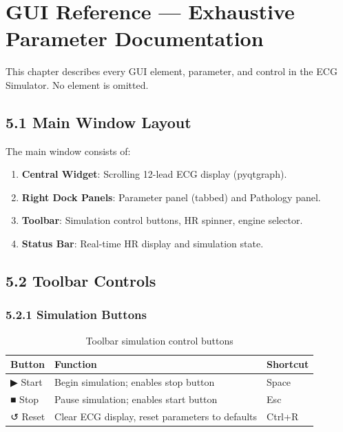 \chapter{GUI Reference — Exhaustive Parameter Documentation}

This chapter describes every GUI element, parameter, and control in the ECG Simulator. No element is omitted.

\section{5.1 Main Window Layout}

The main window consists of:

\begin{enumerate}
  \item \textbf{Central Widget}: Scrolling 12-lead ECG display (pyqtgraph).
  \item \textbf{Right Dock Panels}: Parameter panel (tabbed) and Pathology panel.
  \item \textbf{Toolbar}: Simulation control buttons, HR spinner, engine selector.
  \item \textbf{Status Bar}: Real-time HR display and simulation state.
\end{enumerate}

\section{5.2 Toolbar Controls}

\subsection{5.2.1 Simulation Buttons}

\begin{table}[H]
\centering
\begin{tabularx}{\textwidth}{|l|X|l|}
\hline
\textbf{Button} & \textbf{Function} & \textbf{Shortcut} \\
\hline
▶ Start & Begin simulation; enables stop button & Space \\
■ Stop & Pause simulation; enables start button & Esc \\
↺ Reset & Clear ECG display, reset parameters to defaults & Ctrl+R \\
\hline
\end{tabularx}
\caption{Toolbar simulation control buttons}
\label{tab:toolbar_buttons}
\end{table}

